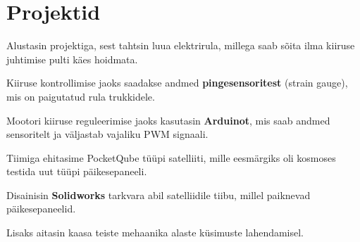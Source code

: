 \documentclass[letterpaper]{deedy-resume} %
\begin{document}
\begin{minipage}[t]{0.66\textwidth}
\section{Projektid}

%
%




\begin{tightitemize}
\item Alustasin projektiga, sest tahtsin luua elektrirula, millega saab sõita ilma kiiruse juhtimise pulti käes hoidmata.
\item Kiiruse kontrollimise jaoks saadakse andmed \textbf{pingesensoritest} (strain gauge), mis on paigutatud rula trukkidele.
\item Mootori kiiruse reguleerimise jaoks kasutasin \textbf{Arduinot}, mis saab andmed sensoritelt ja väljastab vajaliku PWM signaali.
\end{tightitemize}

\sectionspace %



\begin{tightitemize}
\item Tiimiga ehitasime PocketQube tüüpi satelliiti, mille eesmärgiks oli kosmoses testida uut tüüpi päikesepaneeli.
\item Disainisin \textbf{Solidworks} tarkvara abil satelliidile tiibu, millel paiknevad päikesepaneelid.
\item Lisaks aitasin kaasa teiste mehaanika alaste küsimuste lahendamisel.
\end{tightitemize}


\end{minipage}
\end{document}
